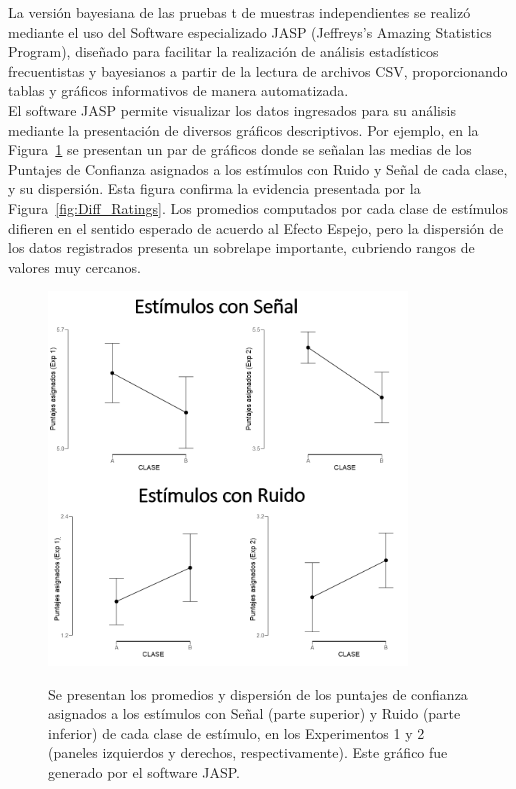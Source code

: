 La versión bayesiana de las pruebas t de muestras independientes se realizó mediante el uso del Software especializado JASP (Jeffreys's Amazing Statistics Program), diseñado para facilitar la realización de análisis estadísticos frecuentistas y bayesianos a partir de la lectura de archivos CSV, proporcionando tablas y gráficos informativos de manera automatizada.\\

El software JASP permite visualizar los datos ingresados para su análisis mediante la presentación de diversos gráficos descriptivos. Por ejemplo, en la Figura~\ref{fig:JASP_MeanRatings} se presentan un par de gráficos donde se señalan las medias de los Puntajes de Confianza asignados a los estímulos con Ruido y Señal de cada clase, y su dispersión. Esta figura confirma la evidencia presentada por la Figura~\ref{fig:Diff_Ratings}. Los promedios computados por cada clase de estímulos difieren en el sentido esperado de acuerdo al Efecto Espejo, pero la dispersión de los datos registrados presenta un sobrelape importante, cubriendo rangos de valores muy cercanos.\\

\begin{figure}[th]
\centering
\includegraphics[width=0.85\textwidth]{Figures/JASP_MeanRatings}\\ 
\caption[Dispersión en las Tasas de Hits y Falsas Alarmas registradas en cada clase de estímulos]{Se presentan los promedios y dispersión de los puntajes de confianza asignados a los estímulos con Señal (parte superior) y Ruido (parte inferior) de cada clase de estímulo, en los Experimentos 1 y 2 (paneles izquierdos y derechos, respectivamente). Este gráfico fue generado por el software JASP.}
\label{fig:JASP_MeanRatings}
\end{figure}

